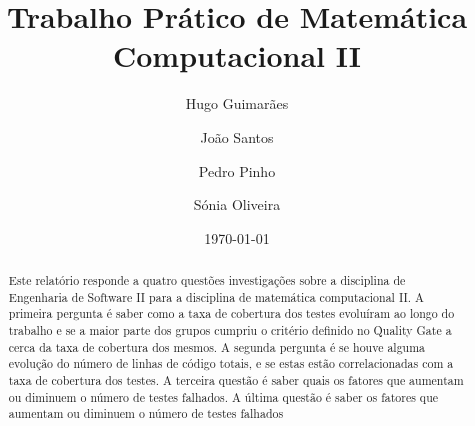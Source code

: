 \documentclass[%
 aip,
cp,  %
 amsmath,amssymb,%
 reprint,%
]{revtex4-2}
\begin{document}
\title{Trabalho Prático de Matemática Computacional II}

\author{Hugo Guimarães}%

\author{João Santos} %
 
\author{Pedro Pinho} %
 
\author{Sónia Oliveira} %


\date{\today} %


\begin{abstract} 
 Este relatório responde a quatro questões investigações sobre a disciplina de Engenharia de Software II para a disciplina de matemática computacional II. A primeira pergunta é saber como a taxa de cobertura dos testes evoluíram ao longo do trabalho e se a maior parte dos grupos cumpriu o critério definido no Quality Gate a cerca da taxa de cobertura dos mesmos. A segunda pergunta é se houve alguma evolução do número de linhas de código totais, e se estas estão correlacionadas com a taxa de cobertura dos testes. A terceira questão é saber quais os fatores que aumentam ou diminuem o número de testes falhados. A última questão é saber os fatores que aumentam ou diminuem o número de testes falhados
\end{abstract}



\maketitle



\end{document}
